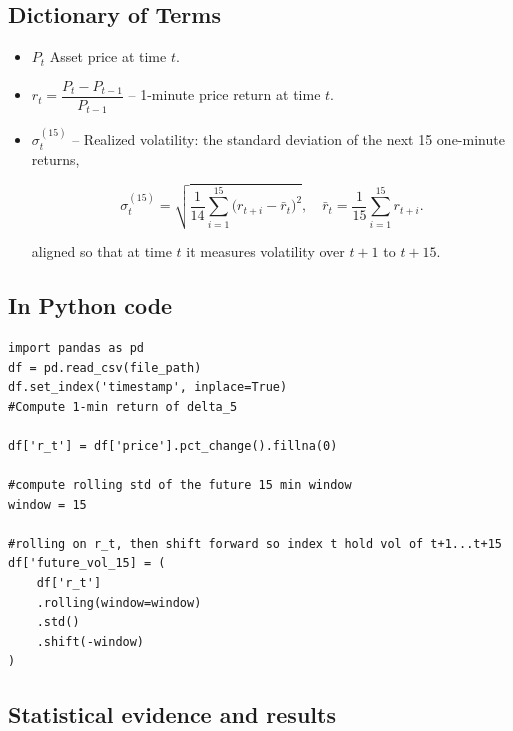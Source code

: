 \documentclass[12pt]{article}
\begin{document}
\subsection{Dictionary of Terms}

\begin{itemize}
    \item $P_t$  
      Asset price at time $t$.
    \item $r_t = \dfrac{P_t - P_{t-1}}{P_{t-1}}$  
      – 1-minute price return at time $t$.
    \item $\sigma^{\mathrm{(15)}}_{t}$  
      – Realized volatility: the standard deviation of the next 15 one-minute returns,
      
      

      
      \begin{equation}\label{eq:realized-vol}
        \sigma^{\mathrm{(15)}}_{t}
        = \sqrt{\frac{1}{14}\sum_{i=1}^{15}\bigl(r_{t+i}-\bar r_{t}\bigr)^{2}},
        \quad
        \bar r_{t} = \frac{1}{15}\sum_{i=1}^{15} r_{t+i}.
      \end{equation}
      



      aligned so that at time $t$ it measures volatility over $t+1$ to $t+15$.
\end{itemize}



\subsection{In Python code}

\begin{verbatim}
import pandas as pd
df = pd.read_csv(file_path)
df.set_index('timestamp', inplace=True)
#Compute 1-min return of delta_5

df['r_t'] = df['price'].pct_change().fillna(0)

#compute rolling std of the future 15 min window
window = 15

#rolling on r_t, then shift forward so index t hold vol of t+1...t+15
df['future_vol_15] = (
    df['r_t']
    .rolling(window=window)
    .std()
    .shift(-window)
)
\end{verbatim}



\newpage

\subsection{Statistical evidence and results}
\end{document}
